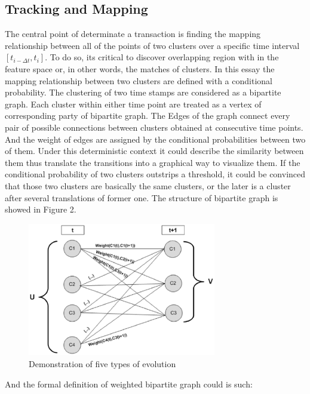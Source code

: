 \documentclass{sig-alternate-05-2015}
\begin{document}
\subsection{Tracking and Mapping}
The central point of determinate a transaction is finding the mapping relationship between all of the points of two clusters over a specific time interval $[t_{i-\Delta t}, t_i]$. To do so, its critical to discover overlapping region with in the feature space or, in other words, the matches of clusters. In this essay the mapping relationship between two clusters are defined with a conditional probability. The clustering of two time stamps are considered as a bipartite graph. Each cluster within either time point are treated as a vertex of corresponding party of bipartite graph. The Edges of the graph connect every pair of possible connections between clusters obtained at consecutive time points. And the weight of edges are assigned by the conditional probabilities between two of them. Under this deterministic context it could describe the similarity between them thus translate the transitions into a graphical way to visualize them. If the conditional probability of two clusters outstrips a threshold, it could be convinced that those two clusters are basically the same clusters, or the later is a cluster after several translations of former one. The structure of bipartite graph is showed in Figure 2.

\begin{figure}
  \centering
  \includegraphics[height=2.3in]{biparite_graph}
  \caption{Demonstration of five types of evolution}
\end{figure}

And the formal definition of weighted bipartite graph could is such:
\end{document}
